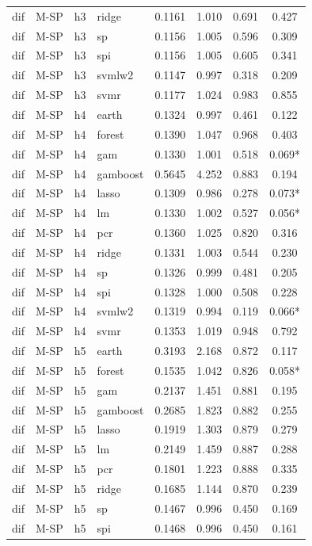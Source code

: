\begin{ThreePartTable}
\begin{longtable}[t]{llclcccc}
dif & M-SP & h3 & ridge & 0.1161 & 1.010 & 0.691 & 0.427\\
dif & M-SP & h3 & sp & 0.1156 & 1.005 & 0.596 & 0.309\\
dif & M-SP & h3 & spi & 0.1156 & 1.005 & 0.605 & 0.341\\
dif & M-SP & h3 & svmlw2 & 0.1147 & 0.997 & 0.318 & 0.209\\
dif & M-SP & h3 & svmr & 0.1177 & 1.024 & 0.983 & 0.855\\
\addlinespace
dif & M-SP & h4 & earth & 0.1324 & 0.997 & 0.461 & 0.122\\
dif & M-SP & h4 & forest & 0.1390 & 1.047 & 0.968 & 0.403\\
dif & M-SP & h4 & gam & 0.1330 & 1.001 & 0.518 & 0.069*\\
dif & M-SP & h4 & gamboost & 0.5645 & 4.252 & 0.883 & 0.194\\
dif & M-SP & h4 & lasso & 0.1309 & 0.986 & 0.278 & 0.073*\\
dif & M-SP & h4 & lm & 0.1330 & 1.002 & 0.527 & 0.056*\\
dif & M-SP & h4 & pcr & 0.1360 & 1.025 & 0.820 & 0.316\\
dif & M-SP & h4 & ridge & 0.1331 & 1.003 & 0.544 & 0.230\\
dif & M-SP & h4 & sp & 0.1326 & 0.999 & 0.481 & 0.205\\
dif & M-SP & h4 & spi & 0.1328 & 1.000 & 0.508 & 0.228\\
dif & M-SP & h4 & svmlw2 & 0.1319 & 0.994 & 0.119 & 0.066*\\
dif & M-SP & h4 & svmr & 0.1353 & 1.019 & 0.948 & 0.792\\
\addlinespace
dif & M-SP & h5 & earth & 0.3193 & 2.168 & 0.872 & 0.117\\
dif & M-SP & h5 & forest & 0.1535 & 1.042 & 0.826 & 0.058*\\
dif & M-SP & h5 & gam & 0.2137 & 1.451 & 0.881 & 0.195\\
dif & M-SP & h5 & gamboost & 0.2685 & 1.823 & 0.882 & 0.255\\
dif & M-SP & h5 & lasso & 0.1919 & 1.303 & 0.879 & 0.279\\
dif & M-SP & h5 & lm & 0.2149 & 1.459 & 0.887 & 0.288\\
dif & M-SP & h5 & pcr & 0.1801 & 1.223 & 0.888 & 0.335\\
dif & M-SP & h5 & ridge & 0.1685 & 1.144 & 0.870 & 0.239\\
dif & M-SP & h5 & sp & 0.1467 & 0.996 & 0.450 & 0.169\\
dif & M-SP & h5 & spi & 0.1468 & 0.996 & 0.450 & 0.161\\

\end{longtable}
\end{ThreePartTable}
